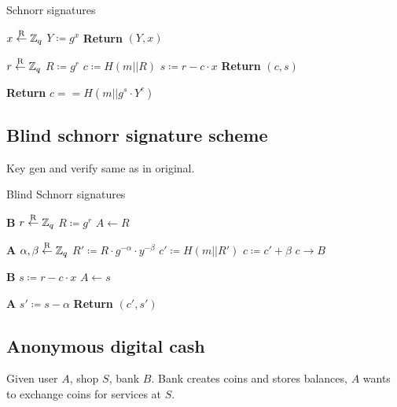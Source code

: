 \begin{algorithm}
		\caption{Schnorr signatures}
		\begin{algorithmic}[0]
				\State $x \overset{\mathrm{R}}{\gets} \mathbb{Z}_q$
				\State $Y \coloneqq g^x$
				\State \textbf{Return} $(Y, x)$
				\EndProcedure

				\State $r \overset{\mathrm{R}}{\gets} \mathbb{Z}_q$
				\State $R \coloneqq g^r$
				\State $c \coloneqq H(m || R)$
				\State $s \coloneqq r - c \cdot x$
				\State \textbf{Return} $(c, s)$
				\EndProcedure

				\State \textbf{Return} $c == H(m || g^s \cdot Y^c)$
				\EndProcedure
		\end{algorithmic}
\end{algorithm}

\subsection{Blind schnorr signature scheme}

Key gen and verify same as in original.

\begin{algorithm}
		\caption{Blind Schnorr signatures}
		\begin{algorithmic}[0]
				\State \textbf{B}
				\State $r \overset{\mathrm{R}}{\gets} \mathbb{Z}_q$
				\State $R \coloneqq g^r$
				\State $A \leftarrow R$

				\State \textbf{A}
				\State $\alpha, \beta \overset{\mathrm{R}}{\gets} \mathbb{Z}_q$
				\State $R' \coloneqq R \cdot g^{-\alpha} \cdot y^{-\beta}$
				\State $c' \coloneqq H(m || R')$
				\State $c \coloneqq c' + \beta$
				\State $c \rightarrow B$

				\State \textbf{B}
				\State $s \coloneqq r - c \cdot x$
				\State $A \leftarrow s$

				\State \textbf{A}
				\State $s' \coloneqq s - \alpha$
				\State \textbf{Return} $(c', s')$
				\EndProcedure
		\end{algorithmic}
\end{algorithm}

\subsection{Anonymous digital cash}

Given user $A$, shop $S$, bank $B$. Bank creates coins and stores balances, $A$
wants to exchange coins for services at $S$.

